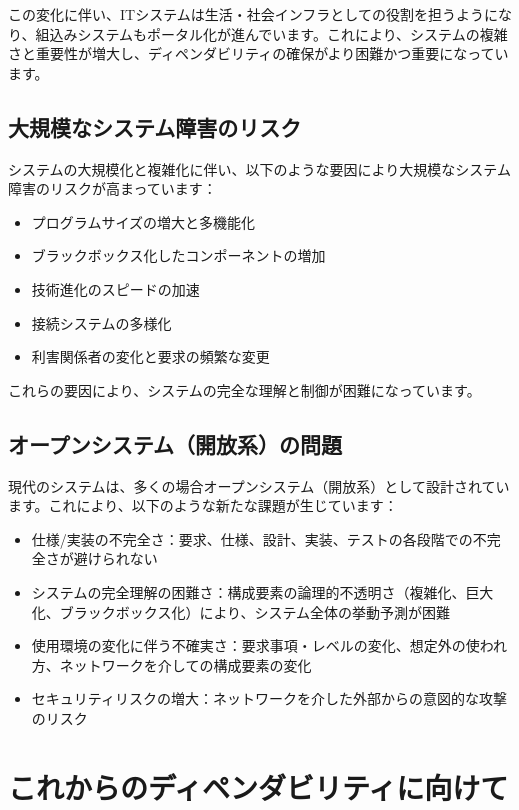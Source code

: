 この変化に伴い、ITシステムは生活・社会インフラとしての役割を担うようになり、組込みシステムもポータル化が進んでいます。これにより、システムの複雑さと重要性が増大し、ディペンダビリティの確保がより困難かつ重要になっています。

\subsection{大規模なシステム障害のリスク}

システムの大規模化と複雑化に伴い、以下のような要因により大規模なシステム障害のリスクが高まっています：
\begin{itemize}
\item プログラムサイズの増大と多機能化
\item ブラックボックス化したコンポーネントの増加
\item 技術進化のスピードの加速
\item 接続システムの多様化
\item 利害関係者の変化と要求の頻繁な変更
\end{itemize}

これらの要因により、システムの完全な理解と制御が困難になっています。

\subsection{オープンシステム（開放系）の問題}

現代のシステムは、多くの場合オープンシステム（開放系）として設計されています。これにより、以下のような新たな課題が生じています：
\begin{itemize}
\item 仕様/実装の不完全さ：要求、仕様、設計、実装、テストの各段階での不完全さが避けられない
\item システムの完全理解の困難さ：構成要素の論理的不透明さ（複雑化、巨大化、ブラックボックス化）により、システム全体の挙動予測が困難
\item 使用環境の変化に伴う不確実さ：要求事項・レベルの変化、想定外の使われ方、ネットワークを介しての構成要素の変化
\item セキュリティリスクの増大：ネットワークを介した外部からの意図的な攻撃のリスク
\end{itemize}

\section{これからのディペンダビリティに向けて}

